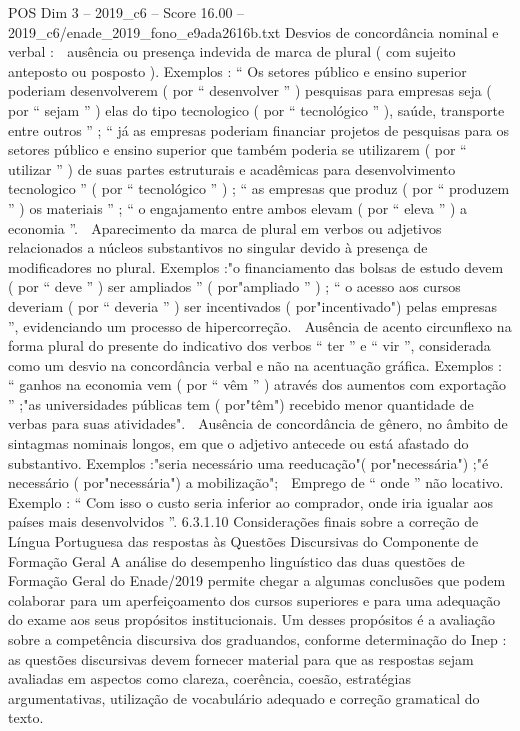 \begin{textsample}{POS Dim 3 – 2019\_c6 – Score 16.00 – 2019\_c6/enade\_2019\_fono\_e9ada2616b.txt}
Desvios de concordância nominal e verbal :  ausência ou presença indevida de marca de plural ( com sujeito anteposto ou posposto ).
Exemplos : “ Os setores público e ensino superior poderiam desenvolverem ( por “ desenvolver ” ) pesquisas para empresas seja ( por “ sejam ” ) elas do tipo tecnologico ( por “ tecnológico ” ), saúde, transporte entre outros ” ; “ já as empresas poderiam financiar projetos de pesquisas para os setores público e ensino superior que também poderia se utilizarem ( por “ utilizar ” ) de suas partes estruturais e acadêmicas para desenvolvimento tecnologico ” ( por “ tecnológico ” ) ; “ as empresas que produz ( por “ produzem ” ) os materiais ” ; “ o engajamento entre ambos elevam ( por “ eleva ” ) a economia ”.  Aparecimento da marca de plural em verbos ou adjetivos relacionados a núcleos substantivos no singular devido à presença de modificadores no plural.
Exemplos :"o financiamento das bolsas de estudo devem ( por “ deve ” ) ser ampliados ” ( por"ampliado ” ) ; “ o acesso aos cursos deveriam ( por “ deveria ” ) ser incentivados ( por"incentivado") pelas empresas ”, evidenciando um processo de hipercorreção.  Ausência de acento circunflexo na forma plural do presente do indicativo dos verbos “ ter ” e “ vir ”, considerada como um desvio na concordância verbal e não na acentuação gráfica.
Exemplos : “ ganhos na economia vem ( por “ vêm ” ) através dos aumentos com exportação ” ;"as universidades públicas tem ( por"têm") recebido menor quantidade de verbas para suas atividades".  Ausência de concordância de gênero, no âmbito de sintagmas nominais longos, em que o adjetivo antecede ou está afastado do substantivo.
Exemplos :"seria necessário uma reeducação"( por"necessária") ;"é necessário ( por"necessária") a mobilização";  Emprego de “ onde ” não locativo.
Exemplo : “ Com isso o custo seria inferior ao comprador, onde iria igualar aos países mais desenvolvidos ”. 6.3.1.10 Considerações finais sobre a correção de Língua Portuguesa das respostas às Questões Discursivas do Componente de Formação Geral A análise do desempenho linguístico das duas questões de Formação Geral do Enade/2019 permite chegar a algumas conclusões que podem colaborar para um aperfeiçoamento dos cursos superiores e para uma adequação do exame aos seus propósitos institucionais.
Um desses propósitos é a avaliação sobre a competência discursiva dos graduandos, conforme determinação do Inep : as questões discursivas devem fornecer material para que as respostas sejam avaliadas em aspectos como clareza, coerência, coesão, estratégias argumentativas, utilização de vocabulário adequado e correção gramatical do texto.

\end{textsample}
